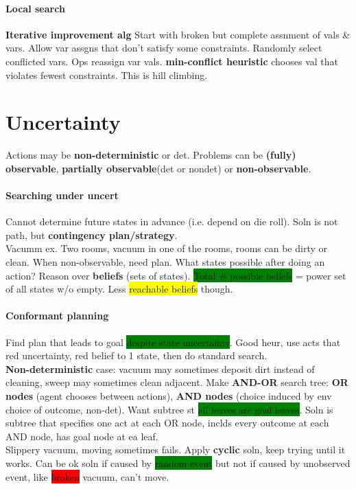 \paragraph{Local search} \textbf{Iterative improvement alg} Start with
broken but complete assnment of vals \& vars. Allow var assgns that
don't satisfy some constraints. Randomly select conflicted vars. Ops
reassign var vals. \textbf{min-conflict heuristic} chooses val that
violates fewest constraints. This is hill climbing.
\color[HTML]{8b0000}
\section{Uncertainty} Actions may be
\textbf{non-deterministic} or det. Problems can be \textbf{(fully) observable},
\textbf{partially observable}(det or nondet) or \textbf{non-observable}.
\paragraph{Searching under uncert} Cannot determine future states in
advance (i.e. depend on die roll). Soln is not path, but
\textbf{contingency plan/strategy}.
\\ Vacumm ex. Two rooms, vacuum in one of the rooms, rooms can be
dirty or clean. When non-observable, need plan. What states possible
after doing an action? Reason over \textbf{beliefs} (sets of
states). \colorbox{green}{Total \# possible beliefs} = power set of
all states w/o empty. Less \colorbox{yellow}{reachable beliefs}
though.
\paragraph{Conformant planning} Find plan that leads to goal
\colorbox{green}{despite state uncertainty}. Good heur, use acts
that red uncertainty, red belief to 1 state, then do standard
search.
\\ \textbf{Non-deterministic} case: vacuum may sometimes deposit dirt
instead of cleaning, sweep may sometimes clean adjacent. Make
\textbf{AND-OR} search tree: \textbf{OR nodes} (agent chooses between
actions), \textbf{AND nodes} (choice induced by env choice of outcome,
non-det). Want subtree st \colorbox{green}{all leaves are goal
  leaves}. Soln is subtree that specifies one act at each OR node,
inclds every outcome at each AND node, has goal node at ea leaf.
\\ Slippery vacuum, moving sometimes fails. Apply \textbf{cyclic}
soln, keep trying until it works. Can be ok soln if caused by
\colorbox{green}{random event} but not if caused by unobserved event,
like \colorbox{red}{broken} vacuum, can't move.
